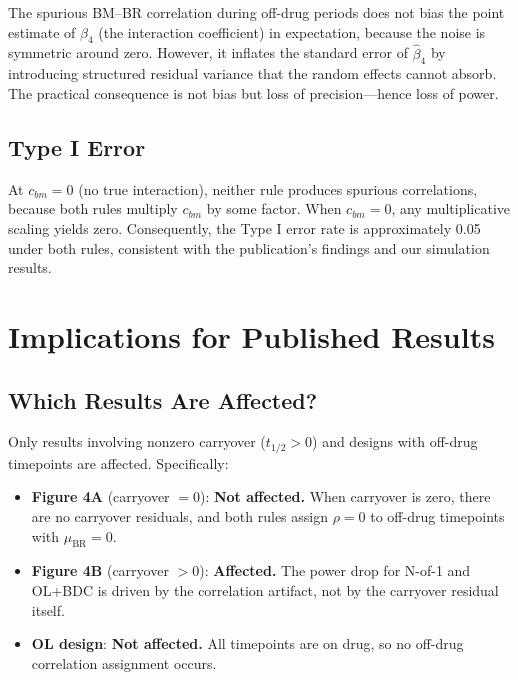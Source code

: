 \documentclass[11pt]{article}
\begin{document}
The spurious BM--BR correlation during off-drug periods does
not bias the point estimate of $\beta_4$ (the interaction
coefficient) in expectation, because the noise is symmetric
around zero. However, it inflates the standard error of
$\hat{\beta}_4$ by introducing structured residual variance
that the random effects cannot absorb. The practical
consequence is not bias but loss of precision---hence loss
of power.

\subsection{Type I Error}

At $c_{bm} = 0$ (no true interaction), neither rule produces
spurious correlations, because both rules multiply $c_{bm}$
by some factor. When $c_{bm} = 0$, any multiplicative
scaling yields zero. Consequently, the Type I error rate is
approximately 0.05 under both rules, consistent with the
publication's findings and our simulation results.

\section{Implications for Published Results}

\subsection{Which Results Are Affected?}

Only results involving nonzero carryover ($t_{1/2} > 0$) and
designs with off-drug timepoints are affected. Specifically:

\begin{itemize}[nosep]
\item \textbf{Figure 4A} (carryover $= 0$): \textbf{Not
  affected.} When carryover is zero, there are no carryover
  residuals, and both rules assign $\rho = 0$ to off-drug
  timepoints with $\mu_{\text{BR}} = 0$.
\item \textbf{Figure 4B} (carryover $> 0$): \textbf{Affected.}
  The power drop for N-of-1 and OL+BDC is driven by the
  correlation artifact, not by the carryover residual itself.
\item \textbf{OL design}: \textbf{Not affected.} All
  timepoints are on drug, so no off-drug correlation
  assignment occurs.
\end{itemize}
\end{document}
